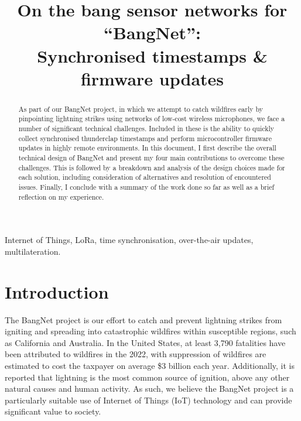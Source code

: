\documentclass[conference]{IEEEtran}
\begin{document}
\title{
	On the bang sensor networks for ``BangNet'': \\
	Synchronised timestamps \& firmware updates
}

\author{
}
\maketitle

\begin{abstract}
As part of our BangNet project, in which we attempt to catch wildfires early by pinpointing lightning strikes using networks of low-cost wireless microphones, we face a number of significant technical challenges. Included in these is the ability to quickly collect synchronised thunderclap timestamps and perform microcontroller firmware updates in highly remote environments. In this document, I first describe the overall technical design of BangNet and present my four main contributions to overcome these challenges. This is followed by a breakdown and analysis of the design choices made for each solution, including consideration of alternatives and resolution of encountered issues. Finally, I conclude with a summary of the work done so far as well as a brief reflection on my experience.
\end{abstract}

\begin{IEEEkeywords}
Internet of Things, LoRa, time synchronisation, over-the-air updates, multilateration.
\end{IEEEkeywords}



\section{Introduction}

The BangNet project is our effort to catch and prevent lightning strikes from igniting and spreading into catastrophic wildfires within susceptible regions, such as California and Australia. In the United States, at least 3,790 fatalities have been attributed to wildfires in the 2022, with suppression of wildfires are estimated to cost the taxpayer on average \$3 billion each year\cite{fire-stats}. Additionally, it is reported that lightning is the most common source of ignition, above any other natural causes and human activity\cite{fire-cause}. As such, we believe the BangNet project is a particularly suitable use of Internet of Things (IoT) technology and can provide significant value to society.
\end{document}
